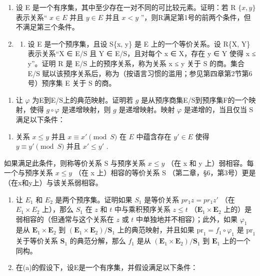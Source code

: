 \exercisegroup

\begin{enumerate}
\def\labelenumi{\arabic{enumi}.}
\item
  设 E 是一个有序集，其中至少存在一对不同的可比较元素。证明：若 R \(\{x, y\}\) 表示关系“ \(x \in E\) 并且 \(y \in E\) 并且 \(x < y\) ''，则R满足第1号的前两个条件，但不满足第三个条件。
\item
  \begin{enumerate}
  \def\labelenumii{(\alph{enumii})}
  \tightlist
  \item
    设 E 是一个预序集，且设 S\{x, y\} 是 E 上的一个等价关系。设 R\{X, Y\} 表示关系“X ∈ E/S 且 Y ∈ E/S，且对每个 x ∈ X，存在 y ∈ Y 使得 x ≤ y”。证明 R 是 E/S 上的预序关系，称为关系 x ≤ y 关于 S 的商。集合 E/S 赋以该预序关系后，称为（按语言习惯的滥用；参见第四章第2节第6号）预序集 E 关于 S 的商。
  \end{enumerate}
\end{enumerate}

\begin{enumerate}
\def\labelenumi{(\alph{enumi})}
\setcounter{enumi}{1}
\tightlist
\item
  让 \(\varphi\) 为E到E/S上的典范映射。证明若 \(g\) 是从预序商集E/S到预序集F的一个映射，使得 \(g \circ \varphi\) 是递增映射，则 \(g\) 是递增映射。映射 \(\varphi\) 是递增的，当且仅当 S 满足以下条件：
\end{enumerate}

\begin{enumerate}
\def\labelenumi{(\Alph{enumi})}
\setcounter{enumi}{2}
\tightlist
\item
  关系 \(x \leqslant y\) 并且 \(x \equiv x' \pmod{S}\) 在 \(E\) 中蕴含存在 \(y' \in E\) 使得 \(y \equiv y' \pmod{S}\) 并且 \(x' \leqslant y'\) .
\end{enumerate}

如果满足此条件，则称等价关系 S 与预序关系 \(x \leqslant y\) （在 x 和 y 上）弱相容。每一个与预序关系 \(x \leqslant y\) （在 x 上）相容的等价关系 S （第二章，§6，第3号）更是（在x和y上）与该关系弱相容。

\begin{enumerate}
\def\labelenumi{(\alph{enumi})}
\setcounter{enumi}{2}
\item
  让 \(E_{1}\) 和 \(E_{2}\) 是两个预序集。证明如果 \(S_{1}\) 是等价关系 \(pr_{1}z = pr_{1}z'\) （在 \(E_{1} \times E_{2}\) 上），那么 \(S_{1}\) 在 \(z\) 和 \(t\) 中与乘积预序关系 \(z \leqslant t\) （\(\mathbf{E}_1 \times \mathbf{E}_2\) 上的）是弱相容的（但通常与这个关系在 \(z\) 或 \(t\) 中单独地并不相容）；此外，如果 \(\varphi_1\) 是从 \(\mathbf{E}_1 \times \mathbf{E}_2\) 到 \((\mathbf{E}_1 \times \mathbf{E}_2)/\mathbf{S}_1\) 上的典范映射，并且如果 \(\mathrm{pr}_1 = f_1 \circ \varphi_1\) 是 \(\mathrm{pr}_1\) 关于等价关系 \(\mathbf{S}_1\) 的典范分解，那么 \(f_1\) 是从 \((\mathbf{E}_1 \times \mathbf{E}_2)/\mathbf{S}_1\) 到 \(\mathbf{E}_1\) 上的一个同构。
\item
  在(a)的假设下，设E是一个有序集，并假设满足以下条件：
\end{enumerate}

